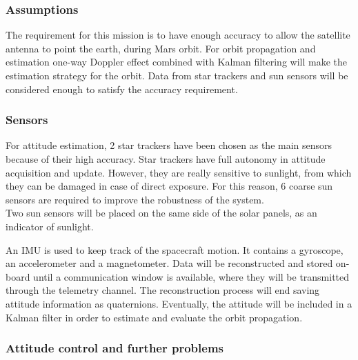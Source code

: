 \documentclass[a4paper, oneside, 11pt]{article}
\begin{document}
\subsubsection{Assumptions}

The requirement for this mission is to have enough accuracy to allow the satellite antenna to point the earth, during Mars orbit. For orbit propagation and estimation one-way Doppler effect combined with Kalman filtering will make the estimation strategy for the orbit. Data from star trackers and sun sensors will be considered enough to satisfy the accuracy requirement. \\

\subsubsection{Sensors}

For attitude estimation, 2 star trackers have been chosen as the main sensors because of their high accuracy. Star trackers have full autonomy in attitude acquisition and update. However, they are really sensitive to sunlight, from which they can be damaged in case of direct exposure. For this reason, 6 coarse sun sensors are required to improve the robustness of the system.\\
Two sun sensors will be placed on the same side of the solar panels, as an indicator of sunlight.

An IMU is used to keep track of the spacecraft motion. It contains a gyroscope, an accelerometer and a magnetometer. Data will be reconstructed and stored on-board until a communication window is available, where they will be transmitted through the telemetry channel. The reconstruction process will end saving attitude information as quaternions. Eventually, the attitude will be included in a Kalman filter in order to estimate and evaluate the orbit propagation.


\subsubsection{Attitude control and further problems}
\end{document}
